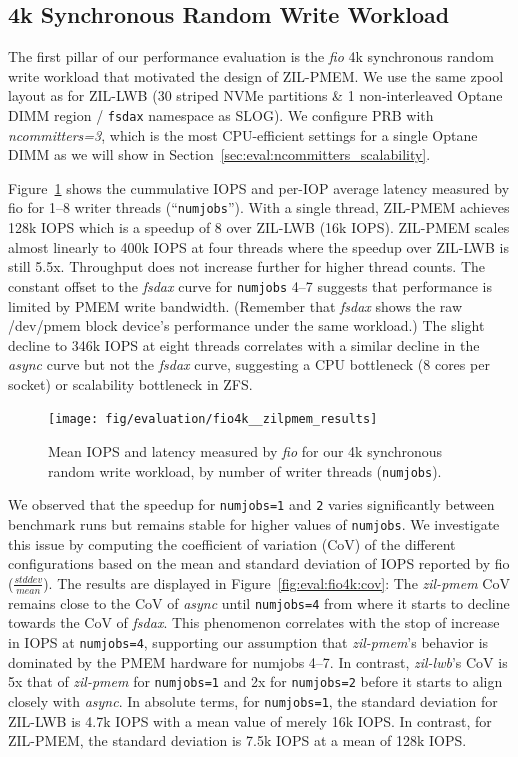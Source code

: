 \documentclass[12pt,a4paper,twoside]{book}
\begin{document}
\subsection{4k Synchronous Random Write Workload}\label{sec:eval:4ksyncwrites}
The first pillar of our performance evaluation is the \textit{fio} 4k synchronous random write workload that motivated the design of ZIL-PMEM.
We use the same zpool layout as for ZIL-LWB (30 striped NVMe partitions \& 1 non-interleaved Optane DIMM region / \lstinline{fsdax} namespace as SLOG).
We configure PRB with \textit{ncommitters=3}, which is the most CPU-efficient settings for a single Optane DIMM as we will show in Section~\ref{sec:eval:ncommitters_scalability}.

Figure~\ref{fig:eval:fio4k:metrics} shows the cummulative IOPS and per-IOP average latency measured by fio for 1--8 writer threads (``\lstinline{numjobs}'').
With a single thread, ZIL-PMEM achieves 128k IOPS which is a speedup of 8 over ZIL-LWB (16k IOPS).
ZIL-PMEM scales almost linearly to 400k IOPS at four threads where the speedup over ZIL-LWB is still 5.5x.
Throughput does not increase further for higher thread counts.
The constant offset to the \textit{fsdax} curve for \lstinline{numjobs} 4--7 suggests that performance is limited by PMEM write bandwidth.
(Remember that \textit{fsdax} shows the raw /dev/pmem block device's performance under the same workload.)
The slight decline to 346k IOPS at eight threads correlates with a similar decline in the \textit{async} curve but not the \textit{fsdax} curve, suggesting a CPU bottleneck (8 cores per socket) or scalability bottleneck in ZFS.

\begin{figure}[H]
    \centering
    \texttt{[image: fig/evaluation/fio4k\_\_zilpmem\_results]}
    \caption{Mean IOPS and latency measured by \textit{fio} for our 4k synchronous random write workload, by number of writer threads (\lstinline{numjobs}).}
    \label{fig:eval:fio4k:metrics}
\end{figure}

We observed that the speedup for \lstinline{numjobs=1} and \lstinline{2} varies significantly between benchmark runs but remains stable for higher values of \lstinline{numjobs}.
We investigate this issue by computing the coefficient of variation (CoV) of the different configurations based on the mean and standard deviation of IOPS reported by fio ($\frac{stddev}{mean}$).
The results are displayed in Figure~\ref{fig:eval:fio4k:cov}:
The \textit{zil-pmem} CoV remains close to the CoV of \textit{async} until \lstinline{numjobs=4} from where it starts to decline towards the CoV of \textit{fsdax}.
This phenomenon correlates with the stop of increase in IOPS at \lstinline{numjobs=4}, supporting our assumption that \textit{zil-pmem}'s behavior is dominated by the PMEM hardware for numjobs 4--7.
In contrast, \textit{zil-lwb}'s CoV is 5x that of \textit{zil-pmem} for \lstinline{numjobs=1} and 2x for \lstinline{numjobs=2} before it starts to align closely with \textit{async}.
In absolute terms, for \lstinline{numjobs=1}, the standard deviation for ZIL-LWB is 4.7k IOPS with a mean value of merely 16k IOPS.
In contrast, for ZIL-PMEM, the standard deviation is 7.5k IOPS at a mean of 128k IOPS.
\end{document}
